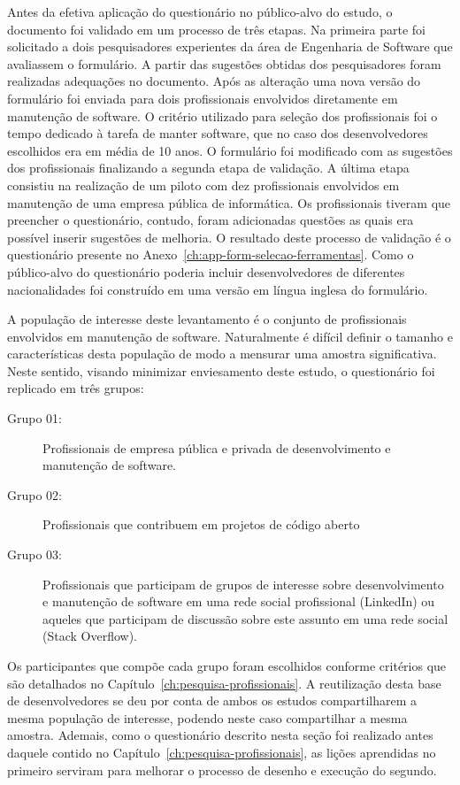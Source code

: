 Antes da efetiva aplicação do questionário no público-alvo do estudo, o
documento foi validado em um processo de três etapas. Na primeira parte foi
solicitado a dois pesquisadores experientes da área de Engenharia de Software
que avaliassem o formulário. A partir das sugestões obtidas dos pesquisadores
foram realizadas adequações no documento. Após as alteração uma nova versão do
formulário foi enviada para dois profissionais envolvidos diretamente em
manutenção de software. O critério utilizado para seleção dos profissionais foi
o tempo dedicado à tarefa de manter software, que no caso dos desenvolvedores
escolhidos era em média de 10 anos. O formulário foi modificado com as sugestões
dos profissionais finalizando a segunda etapa de validação. A última etapa
consistiu na realização de um piloto com dez profissionais envolvidos em
manutenção de uma empresa pública de informática. Os profissionais tiveram que
preencher o questionário, contudo, foram adicionadas questões as quais era
possível inserir sugestões de melhoria. O resultado deste processo de validação
é o questionário presente no Anexo~\ref{ch:app-form-selecao-ferramentas}. Como o
público-alvo do questionário poderia incluir desenvolvedores de diferentes
nacionalidades foi construído em uma versão em língua inglesa do formulário.

A população de interesse deste levantamento é o conjunto de profissionais
envolvidos em manutenção de software. Naturalmente é difícil definir o tamanho e
características desta população de modo a mensurar uma amostra significativa.
Neste sentido, visando minimizar enviesamento deste estudo, o questionário
foi replicado em três grupos:

\begin{description}
	\item[Grupo 01:] Profissionais de empresa pública e privada de
			desenvolvimento e manutenção de software.
	\item[Grupo 02:] Profissionais que contribuem em projetos de
		código aberto
	\item[Grupo 03:] Profissionais que participam de grupos de
		interesse sobre desenvolvimento e manutenção de software em uma rede
		social profissional (LinkedIn) ou aqueles que participam de discussão
		sobre este assunto em uma rede social (Stack Overflow).
\end{description}

Os participantes que compõe cada grupo foram escolhidos conforme critérios que
são detalhados no Capítulo~\ref{ch:pesquisa-profissionais}. A reutilização desta
base de desenvolvedores se deu por conta de ambos os estudos compartilharem a
mesma população de interesse, podendo neste caso compartilhar a mesma amostra.
Ademais, como o questionário descrito nesta seção foi realizado antes daquele
contido no Capítulo~\ref{ch:pesquisa-profissionais}, as lições aprendidas no
primeiro serviram para melhorar o processo de desenho e execução do segundo.

